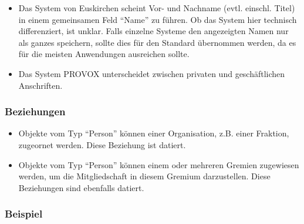 \documentclass[,a4paper]{article}
\begin{document}
\begin{itemize}
\item
  Das System von Euskirchen scheint Vor- und Nachname (evtl. einschl.
  Titel) in einem gemeinsamen Feld ``Name'' zu führen. Ob das System
  hier technisch differenziert, ist unklar. Falls einzelne Systeme den
  angezeigten Namen nur als ganzes speichern, sollte dies für den
  Standard übernommen werden, da es für die meisten Anwendungen
  ausreichen sollte.
\item
  Das System PROVOX unterscheidet zwischen privaten und geschäftlichen
  Anschriften.
\end{itemize}

\subsubsection{Beziehungen}

\begin{itemize}
\item
  Objekte vom Typ ``Person'' können einer Organisation, z.B. einer
  Fraktion, zugeornet werden. Diese Beziehung ist datiert.
\item
  Objekte vom Typ ``Person'' können einem oder mehreren Gremien
  zugewiesen werden, um die Mitgliedschaft in diesem Gremium
  darzustellen. Diese Beziehungen sind ebenfalls datiert.
\end{itemize}

\subsubsection{Beispiel}
\end{document}
